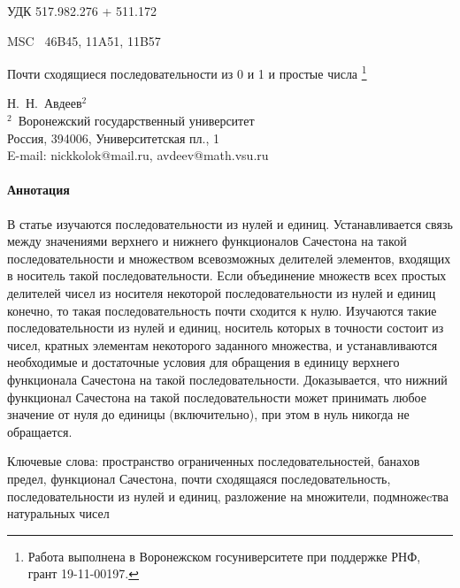 \documentclass[a4paper,openbib]{article}
\theoremstyle{definition}
\begin{document}
УДК  { 517.982.276 %
     + 511.172    }%

MSC~
	46B45,
	11A51,
	11B57



\begin{center}
	Почти сходящиеся последовательности из 0 и 1 и простые числа
	\footnote{
		Работа выполнена в Воронежском госуниверситете при поддержке РНФ, грант 19-11-00197.
	}
\end{center}

\begin{center}
	{Н.~Н.~Авдеев$^{2}$\\[4pt]}
	{\rm\footnotesize{$^2$\,
	Воронежский государственный университет\\
	Россия, 394006, Университетская пл., 1\\
	E-mail: nickkolok@mail.ru, avdeev@math.vsu.ru}}
\end{center}



\paragraph{Аннотация}
В статье изучаются последовательности из нулей и единиц.
Устанавливается связь между значениями верхнего и нижнего функционалов Сачестона
на такой последовательности и множеством всевозможных делителей
элементов, входящих в носитель такой последовательности.
Если объединение множеств всех простых делителей чисел из носителя некоторой последовательности
из нулей и единиц конечно, то такая последовательность почти сходится к нулю.
Изучаются такие последовательности из нулей и единиц,
носитель которых в точности состоит из чисел,
кратных элементам некоторого заданного множества,
и устанавливаются необходимые и достаточные условия для обращения в единицу верхнего функционала Сачестона
на такой последовательности.
Доказывается, что нижний функционал Сачестона на такой последовательности
может принимать любое значение от нуля до единицы (включительно),
при этом в нуль никогда не обращается.



Ключевые слова:
	пространство ограниченных последовательностей,
	банахов предел,
	функционал Сачестона,
	почти сходящаяся последовательность,
	последовательности из нулей и единиц,
	разложение на множители,
	подмножеcтва натуральных чисел
\end{document}
